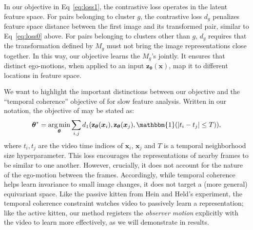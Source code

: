 \documentclass[10pt,twocolumn,letterpaper]{article}
\DeclareMathOperator*{\argmin}{arg\,min}
\newcommand{\cc}{}
\begin{document}
In our objective in Eq~\eqref{eq:loss1}, the contrastive loss operates in the latent feature space. For pairs belonging to cluster $g$, the contrastive loss $d_g$ penalizes feature space distance between the first image and its transformed pair, similar to Eq~\eqref{eq:loss0} above.  For pairs belonging to clusters other than $g$, $d_g$ requires that the transformation defined by $M_g$ must not bring the image representations close together.  In this way, our objective learns the $M_g$'s jointly. It ensures that distinct ego-motions, when applied to an input $\mathbf{z}_{\bm{\theta}}(\bm{x})$, map it to different locations in feature space.


We want to highlight the important distinctions between our objective and the ``temporal coherence'' objective of \cite{Mobahi2009}\cc{for slow feature analysis}.   Written in our notation, the objective of \cite{Mobahi2009} may be stated as:
\vspace{-0.05in}\begin{equation}
  \bm{\theta}^* = \argmin_{\bm{\theta}} \sum_{i,j} d_{1}(\mathbf{z}_{\bm{\theta}}(\bm{x}_i),\mathbf{z}_{\bm{\theta}}(\bm{x}_j), \mathbbm{1}(|t_i-t_j|\leq T)),
  \label{eq:temp_coherence}
\end{equation}
where $t_i, t_j$ are the video time indices of $\bm{x}_i$, $\bm{x}_j$ and $T$ is a temporal neighborhood size hyperparameter.  This loss encourages the representations of nearby frames to be similar to one another.  However, crucially, it does not account for the nature of the ego-motion between the frames.  Accordingly, while temporal coherence helps learn invariance to small image changes, it does not target a (more general) equivariant space.  Like the passive kitten from Hein and Held's experiment, the temporal coherence constraint watches video to passively learn a representation; like the active kitten, our method registers the \emph{observer motion} explicitly with the video to learn more effectively, as we will demonstrate in results.
\end{document}
